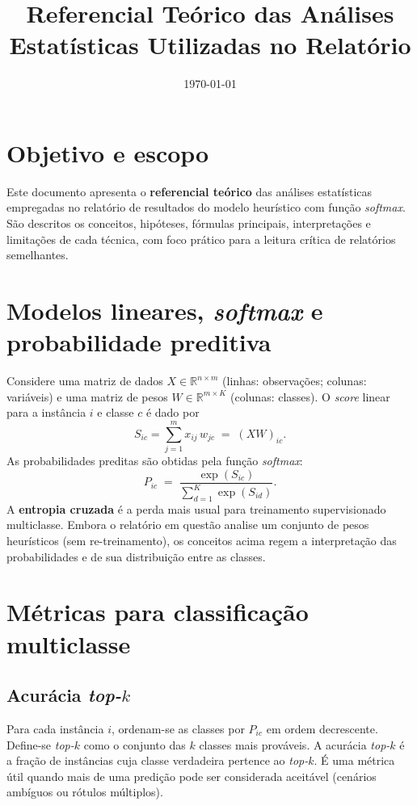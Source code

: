 \documentclass[12pt,a4paper]{article}
\title{Referencial Teórico das Análises Estatísticas Utilizadas no Relatório}
\author{}
\date{\today}
\begin{document}
\maketitle

\section{Objetivo e escopo}
Este documento apresenta o \textbf{referencial teórico} das análises estatísticas empregadas no relatório de resultados do modelo heurístico com função \textit{softmax}. São descritos os conceitos, hipóteses, fórmulas principais, interpretações e limitações de cada técnica, com foco prático para a leitura crítica de relatórios semelhantes.

\section{Modelos lineares, \textit{softmax} e probabilidade preditiva}
Considere uma matriz de dados $X \in \mathbb{R}^{n \times m}$ (linhas: observações; colunas: variáveis) e uma matriz de pesos $W \in \mathbb{R}^{m \times K}$ (colunas: classes). O \emph{score} linear para a instância $i$ e classe $c$ é dado por
\begin{equation}
S_{ic} = \sum_{j=1}^{m} x_{ij}\,w_{jc} \;=\; (XW)_{ic}.
\end{equation}
As probabilidades preditas são obtidas pela função \textit{softmax}:
\begin{equation}
P_{ic} \;=\; \frac{\exp(S_{ic})}{\sum_{d=1}^{K} \exp(S_{id})}.
\end{equation}
A \textbf{entropia cruzada} é a perda mais usual para treinamento supervisionado multiclasse. Embora o relatório em questão analise um conjunto de pesos heurísticos (sem re-treinamento), os conceitos acima regem a interpretação das probabilidades e de sua distribuição entre as classes.

\section{Métricas para classificação multiclasse}
\subsection{Acurácia \texorpdfstring{\emph{top-$k$}}{top-k}}
Para cada instância $i$, ordenam-se as classes por $P_{ic}$ em ordem decrescente. Define-se \emph{top-$k$} como o conjunto das $k$ classes mais prováveis. A acurácia \emph{top-$k$} é a fração de instâncias cuja classe verdadeira pertence ao \emph{top-$k$}. É uma métrica útil quando mais de uma predição pode ser considerada aceitável (cenários ambíguos ou rótulos múltiplos).
\end{document}
